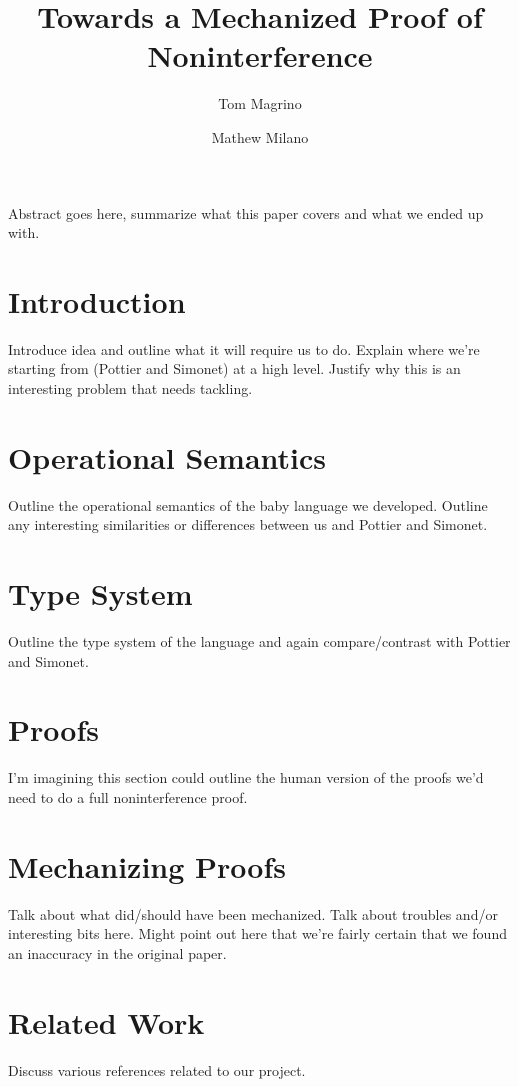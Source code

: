 \documentclass[a4paper,twocolumn]{article}
\title{Towards a Mechanized Proof of Noninterference}
\author{Tom Magrino \and Mathew Milano}
\begin{document}
\maketitle

\abstract
Abstract goes here, summarize what this paper covers and what we ended up with.

\section{Introduction}
Introduce idea and outline what it will require us to do.  Explain where we're
starting from (Pottier and Simonet) at a high level.  Justify why this is an
interesting problem that needs tackling.

\section{Operational Semantics}
Outline the operational semantics of the baby language we developed.  Outline
any interesting similarities or differences between us and Pottier and Simonet.

\section{Type System}
Outline the type system of the language and again compare/contrast with
Pottier and Simonet.

\section{Proofs}

I'm imagining this section could outline the human version of the proofs we'd
need to do a full noninterference proof.

\section{Mechanizing Proofs}

Talk about what did/should have been mechanized.  Talk about troubles and/or
interesting bits here.  Might point out here that we're fairly certain that we
found an inaccuracy in the original paper.

\section{Related Work}

Discuss various references related to our project.
\end{document}
